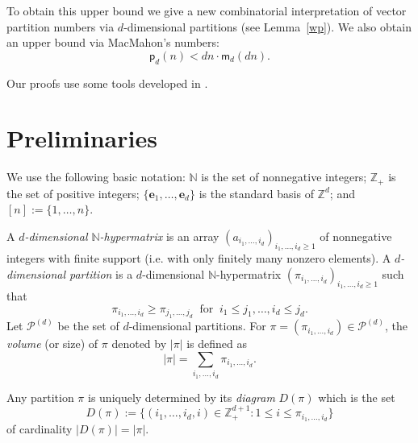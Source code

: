 \documentclass[12pt]{amsart}
\theoremstyle{definition}
\theoremstyle{remark}
\begin{document}
To obtain this
upper bound %
we give a new combinatorial interpretation of vector partition numbers via $d$-dimensional partitions (see Lemma~\ref{wp}).
We also obtain an upper bound via MacMahon's numbers: $$\mathsf{p}_d(n) < dn \cdot \mathsf{m}_d(dn).$$


Our proofs %
use some tools developed in \cite{ay}.  


\section{Preliminaries}

We use the following basic notation: $\mathbb{N}$ is the set of nonnegative integers; $\mathbb{Z}_+$ is the set of positive integers; $\{\mathbf{e}_1, \ldots, \mathbf{e}_d\}$ is the standard basis of $\mathbb{Z}^d$; and $[n] := \{1, \ldots, n \}$.

\vspace{0.5em}

A {\it $d$-dimensional $\mathbb{N}$-hypermatrix} is an array $\left(a_{i_1, \ldots, i_d}\right)_{i_1, \ldots, i_d \ge 1}$ of nonnegative integers %
with finite support (i.e. with only finitely many nonzero elements). 
A {\it $d$-dimensional partition} is a $d$-dimensional 
$\mathbb{N}$-hypermatrix 
$\left(\pi_{i_1, \ldots, i_d} \right)_{i_1,\ldots, i_d \ge 1}$ 
such that 
$$
\pi_{i_1, \ldots, i_d} \ge \pi_{j_1, \ldots, j_d} ~\text{ for }~ i_1 \le j_1, \ldots, i_d \le j_d.
$$
Let %
$\mathcal{P}^{(d)}$ be the set of $d$-dimensional partitions. 
For $\pi = (\pi_{i_1, \ldots, i_d}) \in \mathcal{P}^{(d)}$, the {\it volume} (or size) of $\pi$ denoted by $|\pi|$ is defined as 
$$
|\pi| = \sum_{i_1, \ldots, i_d} \pi_{i_1, \ldots, i_d}.
$$

Any partition $\pi$ is uniquely determined by its {\it diagram} $D(\pi)$ which is the set 
$$D(\pi) := \{(i_1, \ldots, i_d, i) \in \mathbb{Z}^{d+1}_+: 1 \le i \le \pi_{i_1, \ldots, i_d} \} %
$$
of cardinality $|D(\pi)| = |\pi|$. 
\end{document}

